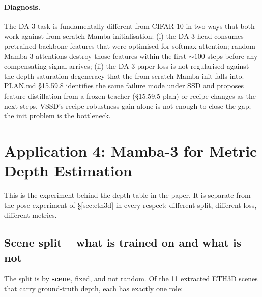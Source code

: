 \documentclass[11pt,a4paper]{article}
\begin{document}
\paragraph{Diagnosis.}
The DA-3 task is fundamentally different from CIFAR-10 in two ways
that both work against from-scratch Mamba initialisation: (i) the
DA-3 head consumes pretrained backbone features that were optimised
for softmax attention; random Mamba-3 attentions destroy those
features within the first $\sim 100$ steps before any compensating
signal arrives; (ii) the DA-3 paper loss is not regularised against
the depth-saturation degeneracy that the from-scratch Mamba init
falls into. PLAN.md \S15.59.8 identifies the same failure mode
under SSD and proposes feature distillation from a frozen teacher
(\S15.59.5 plan) or recipe changes as the next steps. VSSD's
recipe-robustness gain alone is not enough to close the gap; the
init problem is the bottleneck.

\section{Application 4: Mamba-3 for Metric Depth Estimation}
\label{sec:eth3d-depth}

This is the experiment behind the depth table in the paper. It is separate from
the pose experiment of \S\ref{sec:eth3d} in every respect: different split,
different loss, different metrics.

\subsection{Scene split -- what is trained on and what is not}
\label{sec:eth3d-depth-split}

The split is by \textbf{scene}, fixed, and not random. Of the 11 extracted
ETH3D scenes that carry ground-truth depth, each has exactly one role:
\end{document}
